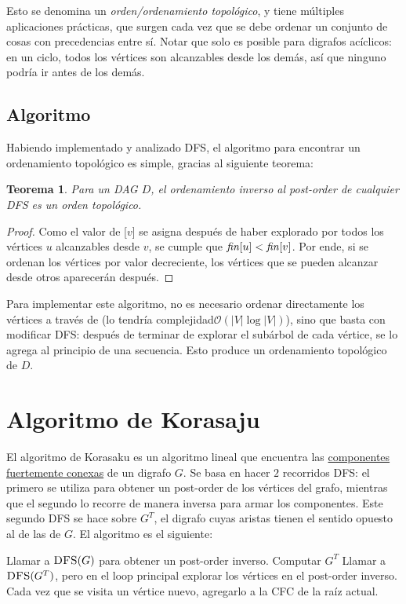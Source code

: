 \documentclass[a4paper]{report}
\newcommand{\BigO}[1]{\ensuremath{\mathcal{O}(#1)}}
\newtheorem*{theorem*}{Teorema}
\begin{document}
Esto se denomina un \textit{orden/ordenamiento topológico}, y tiene múltiples aplicaciones prácticas, que surgen cada vez que se debe ordenar un conjunto de cosas con precedencias entre sí. Notar que solo es posible para digrafos acíclicos: en un ciclo, todos los vértices son alcanzables desde los demás, así que ninguno podría ir antes de los demás.

\subsection{Algoritmo}

Habiendo implementado y analizado DFS, el algoritmo para encontrar un ordenamiento topológico es simple, gracias al siguiente teorema:

\begin{theorem*}
    Para un DAG $D$, el ordenamiento inverso al post-order de cualquier DFS es un orden topológico.
\end{theorem*}
\begin{proof}
    Como el valor de [$v$] se asigna después de haber explorado por todos los vértices $u$ alcanzables desde $v$, se cumple que $\id{fin}[u] < \id{fin}[v]$. Por ende, si se ordenan los vértices por valor  decreciente, los vértices que se pueden alcanzar desde otros aparecerán después.
\end{proof}

Para implementar este algoritmo, no es necesario ordenar directamente los vértices a través de  (lo tendría complejidad\BigO{|V|\log{|V|}}), sino que basta con modificar DFS: después de terminar de explorar el subárbol de cada vértice, se lo agrega al principio de una secuencia. Esto produce un ordenamiento topológico de $D$.

\section{Algoritmo de Korasaju}

El algoritmo de Korasaku es un algoritmo lineal que encuentra las \hyperref[recorridos-digrafos]{componentes fuertemente conexas} de un digrafo $G$. Se basa en hacer $2$ recorridos DFS: el primero se utiliza para obtener un post-order de los vértices del grafo, mientras que el segundo lo recorre de manera inversa para armar los componentes. Este segundo DFS se hace sobre $G^T$, el digrafo cuyas aristas tienen el sentido opuesto al de las de $G$. El algoritmo es el siguiente:

\begin{codebox}
    \li Llamar a $\textnormal{\scshape DFS}(G)$ para obtener un post-order inverso.
    \li Computar $G^T$
    \li Llamar a $\textnormal{\scshape DFS}(G^T)$, pero en el loop principal explorar los vértices en el post-order inverso.
    \zi Cada vez que se visita un vértice nuevo, agregarlo a la CFC de la raíz actual.
\end{codebox}
\end{document}
